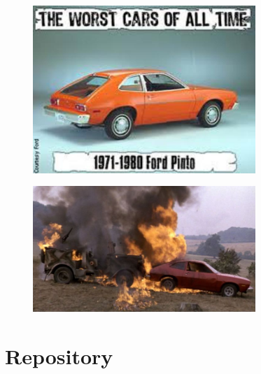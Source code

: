 \documentclass[aspectratio=1610,pdftex,dvipsnames,compress,xcolor={dvipsnames}]{beamer}
\begin{document}
\begin{frame}{}
    \begin{figure}
        \centering
        \includegraphics[width=0.75\textwidth]{pinto.worst.jpg}
    \end{figure}
\end{frame}


\begin{frame}{}
    \begin{figure}
        \centering
        \includegraphics[width=0.75\textwidth]{pinto.fire.jpg}
    \end{figure}
\end{frame}


\section{Repository}
\end{document}
